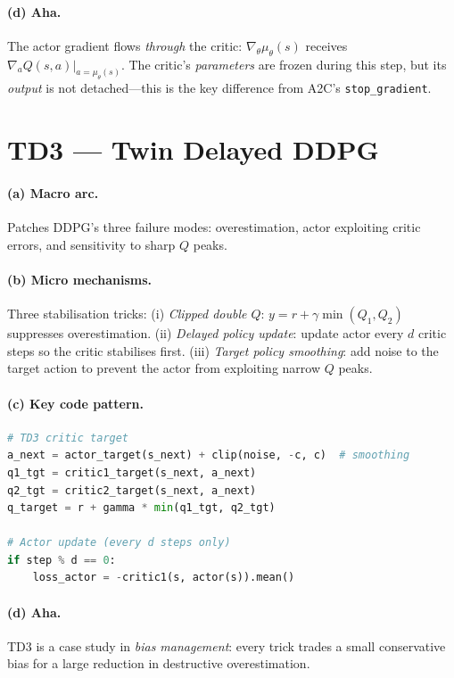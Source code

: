 \paragraph{(d) Aha.}
The actor gradient flows \emph{through} the critic: $\nabla_\theta\mu_\theta(s)$ receives $\nabla_a Q(s,a)\big|_{a=\mu_\theta(s)}$.
The critic's \emph{parameters} are frozen during this step, but its \emph{output} is not detached---this is the key difference from A2C's \texttt{stop\_gradient}.

\section{TD3 --- Twin Delayed DDPG}
\label{sec:td3}

\paragraph{(a) Macro arc.}
Patches DDPG's three failure modes: overestimation, actor exploiting critic errors, and sensitivity to sharp $Q$ peaks.

\paragraph{(b) Micro mechanisms.}
Three stabilisation tricks:
(i) \emph{Clipped double $Q$}: $y = r + \gamma\min(Q_1, Q_2)$ suppresses overestimation.
(ii) \emph{Delayed policy update}: update actor every $d$ critic steps so the critic stabilises first.
(iii) \emph{Target policy smoothing}: add noise to the target action to prevent the actor from exploiting narrow $Q$ peaks.

\paragraph{(c) Key code pattern.}

\begin{lstlisting}[language=Python]
# TD3 critic target
a_next = actor_target(s_next) + clip(noise, -c, c)  # smoothing
q1_tgt = critic1_target(s_next, a_next)
q2_tgt = critic2_target(s_next, a_next)
q_target = r + gamma * min(q1_tgt, q2_tgt)

# Actor update (every d steps only)
if step % d == 0:
    loss_actor = -critic1(s, actor(s)).mean()
\end{lstlisting}

\paragraph{(d) Aha.}
TD3 is a case study in \emph{bias management}: every trick trades a small conservative bias for a large reduction in destructive overestimation.

